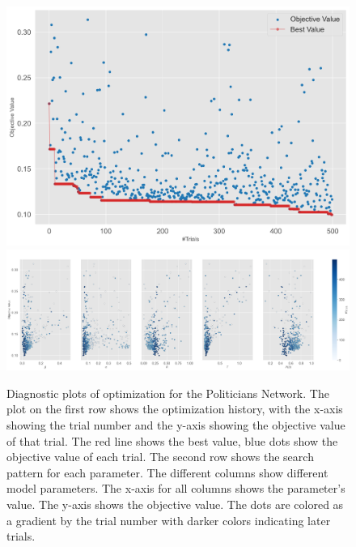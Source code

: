 \documentclass[11pt]{article}
\begin{document}
\begin{figure}[H]
    \centering
    \includegraphics[width=.7\linewidth]{../plots/overall/Optimization_History_politicians.png}
    \includegraphics[width=.7\linewidth]{../plots/overall/Plot_Slice_politicians.png}
  \caption{Diagnostic plots of optimization for the Politicians Network. The plot on the first row shows the optimization history, with the x-axis showing the trial number and the y-axis showing the objective value of that trial. The red line shows the best value, blue dots show the objective value of each trial. The second row shows the search pattern for each parameter. The different columns show different model parameters. The x-axis for all columns shows the parameter's value. The y-axis shows the objective value. The dots are colored as a gradient by the trial number with darker colors indicating later trials.}
  \label{appendix:optimization_politicians}
\end{figure}
\end{document}
